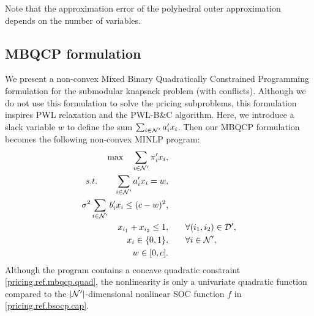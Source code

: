Note that the approximation error of the polyhedral outer approximation depends on the number of variables.

\begin{comment}
We briefly discuss state of the art in solving the BSOCP formulation \eqref{pricing.ref.bsocp}: the LP-B$\&$C algorithm (see \cite{coey2018outer}).

\textbf{solving method for BSOCP formulation} The LP-B$\&$C algorithm constructs an initial root node and explores the search space using a branch-and-cut method. More specifically, the algorithm replaces the capacity constraints \eqref{pricing.ref.bsocp.cap} with valid inequalities, uses a MILP solver to solve the resulting MILP relaxation, and adds cuts during the tree search. Such a method takes advantage of the powerful techniques implemented in modern MILP solvers. Generally, a commercial solver's cuts differ from those induced by $\Theta$.

\end{comment}

\subsection{MBQCP formulation}

We present a non-convex Mixed Binary Quadratically Constrained Programming formulation for the submodular knapsack problem (with conflicts). Although we do not use this formulation to solve the pricing subproblems, this formulation inspires PWL relaxation and the PWL-B$\&$C algorithm. Here, we introduce a slack variable $w$ to define the sum $\sum_{i \in \mathcal N'} a'_i x_i$. Then our MBQCP formulation becomes the following non-convex MINLP program:
\begin{subequations}
\label{pricing.ref.mbqcp}
\begin{align}
  	 \max \quad \sum_{i\in \mathcal N'} \pi'_i x_i, \qquad& \\
    s.t. \qquad  \sum_{i \in \mathcal N'} a'_i x_i = w, \qquad & \\
    \sigma^2\sum_{i \in \mathcal N'} b'_i x_i  \le (c - w)^2,\qquad& \label{pricing.ref.mbqcp.quad}\\
    x_{i_1} + x_{i_2} \le 1, \qquad & \forall (i_1, i_2) \in \mathcal D', \\
    x_i \in \{0,1\},\qquad & \forall  i  \in \mathcal N', \\
    w \in [0,c].\qquad &
\end{align}
\end{subequations}
Although the program contains a concave quadratic constraint \eqref{pricing.ref.mbqcp.quad}, the nonlinearity is only a univariate quadratic function compared to the \(|\mathcal N'|\)-dimensional nonlinear SOC function $f$ in \eqref{pricing.ref.bsocp.cap}.

